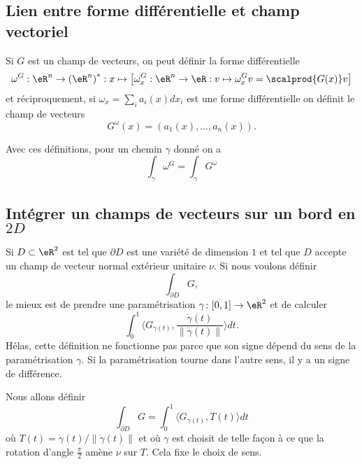 \subsection{Lien entre forme différentielle et champ vectoriel}
Si $G$ est un champ de vecteurs, on peut définir la forme différentielle
\begin{equation*}
  \omega^G : \eR^n \to {(\eR^n)}^\ast : x \mapsto \left\lbrack \omega^G_x :
  \eR^n \to \eR : v \mapsto \omega^G_x v = \scalprod {G(x)}v \right\rbrack
\end{equation*}
et réciproquement, si $\omega_x = \sum_i a_i(x)d x_i$ est une forme
différentielle on définit le champ de vecteurs
\begin{equation*}
  G^\omega(x) = (a_1(x),\ldots,a_n(x)).
\end{equation*}

Avec ces définitions, pour un chemin $\gamma$ donné on a
\begin{equation*}
  \int_\gamma \omega^G = \int_\gamma G^\omega
\end{equation*}

\subsection{Intégrer un champs de vecteurs sur un bord en $2D$}

Si $D\subset\eR^2$ est tel que $\partial D$ est une variété de dimension $1$ et tel que $D$ accepte un champ de vecteur normal extérieur unitaire $\nu$. Si nous voulons définir 
\begin{equation}
	\int_{\partial D}G,
\end{equation}
le mieux est de prendre une paramétrisation $\gamma\colon \mathopen[ 0 , 1 \mathclose]\to \eR^2$ et de calculer
\begin{equation}
	\int_0^1 \langle G_{\gamma(t)}, \frac{ \dot\gamma(t) }{ \| \dot\gamma(t) \| }\rangle dt.
\end{equation}
Hélas, cette définition ne fonctionne pas parce que son signe dépend du sens de la paramétrisation $\gamma$. Si la paramétrisation tourne dans l'autre sens, il y a un signe de différence.

Nous allons définir
\begin{equation}		\label{EqIntVectbordDeux}
	\int_{\partial D}G=\int_0^1\langle G_{\gamma(t)}, T(t)\rangle dt
\end{equation}
où $T(t)=\dot\gamma(t)/\| \dot\gamma(t) \|$ et où $\gamma$ est choisit de telle façon à ce que la rotation d'angle $\frac{ \pi }{ 2 }$ amène $\nu$ sur $T$. Cela fixe le choix de sens.

